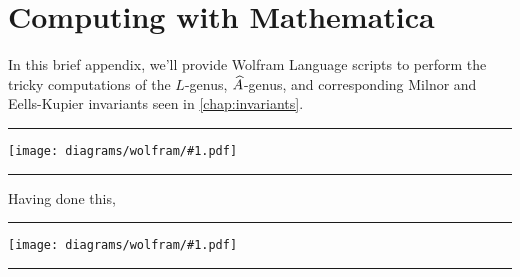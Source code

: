 \newcommand{\wolfram}[1]{
  \noindent
  \begin{center}\rule{\textwidth}{1.2pt}\end{center}
  \texttt{[image: diagrams/wolfram/\#1.pdf]}
  \vspace{-1em}
  \begin{center}\rule{\textwidth}{1.2pt}\end{center}
}

\chapter{Computing with Mathematica}\label{sec:wolfram}

In this brief appendix, we'll provide Wolfram Language scripts to perform the tricky computations of the $L$-genus, $\widehat{A}$-genus, and corresponding Milnor and Eells-Kupier invariants seen in \cref{chap:invariants}.

\wolfram{multseq}

Having done this,

\wolfram{characteristic}
